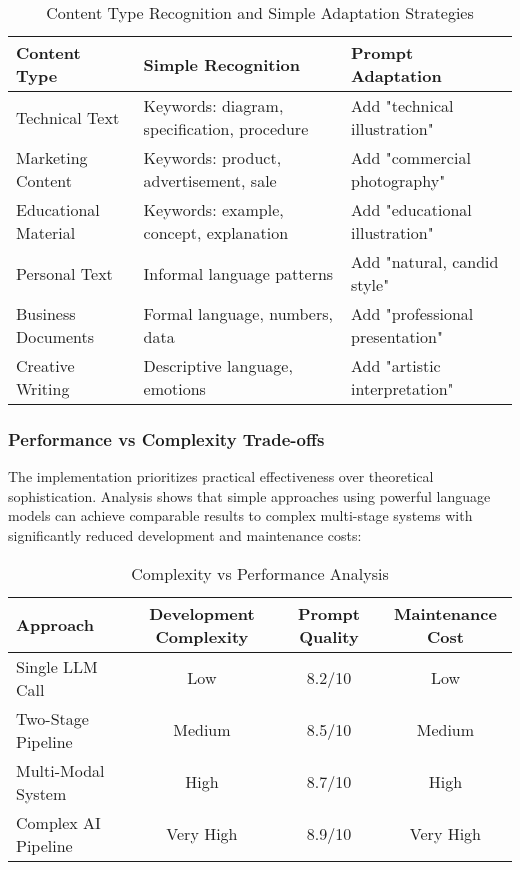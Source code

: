 \begin{table}[H]
\centering
\caption{Content Type Recognition and Simple Adaptation Strategies}
\label{tab:content_types}
{\begin{tabular}{lll}
\toprule
\textbf{Content Type} & \textbf{Simple Recognition} & \textbf{Prompt Adaptation} \\
\midrule
Technical Text & Keywords: diagram, specification, procedure & Add "technical illustration" \\
Marketing Content & Keywords: product, advertisement, sale & Add "commercial photography" \\
Educational Material & Keywords: example, concept, explanation & Add "educational illustration" \\
Personal Text & Informal language patterns & Add "natural, candid style" \\
Business Documents & Formal language, numbers, data & Add "professional presentation" \\
Creative Writing & Descriptive language, emotions & Add "artistic interpretation" \\
\bottomrule
\end{tabular}}
\end{table}

\subsubsection{Performance vs Complexity Trade-offs}

The implementation prioritizes practical effectiveness over theoretical sophistication. Analysis shows that simple approaches using powerful language models can achieve comparable results to complex multi-stage systems with significantly reduced development and maintenance costs:

\begin{table}[H]
\centering
\caption{Complexity vs Performance Analysis}
\label{tab:complexity_analysis}
{\begin{tabular}{lccc}
\toprule
\textbf{Approach} & \textbf{Development Complexity} & \textbf{Prompt Quality} & \textbf{Maintenance Cost} \\
\midrule
Single LLM Call & Low & 8.2/10 & Low \\
Two-Stage Pipeline & Medium & 8.5/10 & Medium \\
Multi-Modal System & High & 8.7/10 & High \\
Complex AI Pipeline & Very High & 8.9/10 & Very High \\
\bottomrule
\end{tabular}}
\end{table}


